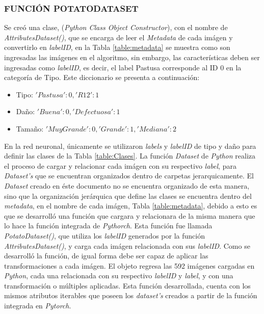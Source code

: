 \subsubsection{FUNCIÓN POTATODATASET}

Se creó una clase, (\textit{Python Class Object Constructor}), con el nombre de \textit{AttributesDataset()}, que se encarga de leer el \textit{Metadata}  de cada imágen y convertirlo en \textit{labelID}, en la Tabla \ref{table:metadata} se muestra como son ingresadas las imágenes en el algoritmo, sin embargo, las características deben ser ingresadas como \textit{labelID}, es decir, el label Pastusa corresponde al ID 0 en la categoría de Tipo. Este diccionario se presenta a continuación:			

\begin{itemize}
	\item Tipo: ${'Pastusa': 0, 'R12': 1}$
	\item Daño: ${'Buena': 0, 'Defectuosa': 1}$
	\item Tamaño: ${'Muy Grande': 0, 'Grande': 1, 'Mediana': 2}$
\end{itemize}

En la red neuronal, únicamente se utilizaron \textit{labels} y \textit{labelID} de tipo y daño para definir las clases de la Tabla \ref{table:Clases}. La función \textit{Dataset} de \textit{Python} realiza el proceso de cargar y relacionar cada imágen con su respectivo \textit{label}, para \textit{Dataset's} que se encuentran organizados dentro de carpetas jerarquicamente. El \textit{Dataset} creado en éste documento no se encuentra organizado de esta manera, sino que la organización jerárquica que define las clases se encuentra dentro del \textit{metadata}, en el nombre de cada imágen, Tabla \ref{table:metadata}, debido a esto es que se desarrolló una función que cargara y relacionara de la misma manera que lo hace la función integrada de \textit{Pythorch}. Esta función fue llamada \textit{PotatoDataset()}, que utiliza los \textit{labelID} generados por la función \textit{AttributesDataset()}, y carga cada imágen relacionada con sus \textit{labelID}. Como se desarrolló la función, de igual forma debe ser capaz de aplicar las transformaciones a cada imágen. El objeto regresa las 592 imágenes cargadas en \textit{Python}, cada una relacionada con su respectivo \textit{labelID} y \textit{label}, y con una transformación o múltiples aplicadas. Esta función desarrollada, cuenta con los mismos atributos iterables que poseen los \textit{dataset's} creados a partir de la función integrada en \textit{Pytorch}.			


